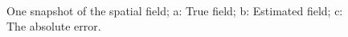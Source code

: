 \documentclass[12pt]{iopart}
\begin{document}
\begin{figure}[!th]
\centering 
{}
\\
\caption{One snapshot of the spatial field; a: True field; b: Estimated field; c: The absolute error.}
\label{fig:FieldEstimate}
\end{figure}
\end{document}
